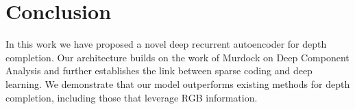 
\section{Conclusion}
\label{sec:conclusion}

In this work we have proposed a novel deep recurrent autoencoder for depth completion. Our architecture builds on the work of Murdock \etal on Deep Component Analysis and further establishes the link between sparse coding and deep learning. We demonstrate that our model outperforms existing methods for depth completion, including those that leverage RGB information. 